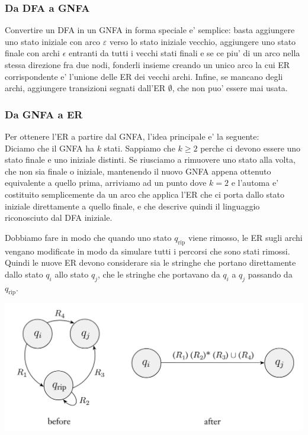 \subsubsection{Da DFA a GNFA}
Convertire un DFA in un GNFA in forma speciale e' semplice: basta aggiungere uno stato iniziale con arco $ \varepsilon $ verso lo stato iniziale vecchio, aggiungere uno stato finale con archi $ \epsilon $ entranti da tutti i vecchi stati finali e se ce piu' di un arco nella stessa direzione fra due nodi, fonderli insieme creando un unico arco la cui ER corrispondente e' l'unione delle ER dei vecchi archi. Infine, se mancano degli archi, aggiungere transizioni segnati dall'ER $ \emptyset $, che non puo' essere mai usata. 

\subsubsection{Da GNFA a ER}
Per ottenere l'ER a partire dal GNFA, l'idea principale e' la seguente:\\
Diciamo che il GNFA ha $ k $ stati. Sappiamo che $ k \geq 2 $ perche ci devono essere uno stato finale e uno iniziale distinti. Se riusciamo a rimuovere uno stato alla volta, che non sia finale o iniziale, mantenendo il nuovo GNFA appena ottenuto equivalente a quello prima, arriviamo ad un punto dove $ k=2 $ e l'automa e' costituito semplicemente da un arco che applica l'ER che ci porta dallo stato iniziale direttamente a quello finale, e che descrive quindi il linguaggio riconosciuto dal DFA iniziale.

Dobbiamo fare in modo che quando uno stato $ q_{\text{rip}} $ viene rimosso, le ER sugli archi vengano modificate in modo da simulare tutti i percorsi che sono stati rimossi. Quindi le nuove ER devono considerare sia le stringhe che portano direttamente dallo stato $ q_i $ allo stato $ q_j $, che le stringhe che portavano da $ q_i $ a $ q_j $ passando da $ q_{\text{rip}} $.

\begin{center}
  \includegraphics[scale=0.3]{img/2024-12-16-18-31-08.png}
\end{center}

